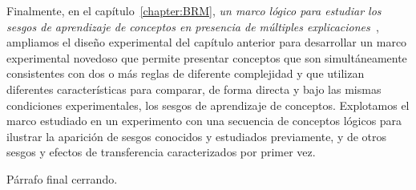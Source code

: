 Finalmente, en el capítulo~\ref{chapter:BRM}, \textit{un marco lógico para estudiar los sesgos de aprendizaje de conceptos en presencia de múltiples explicaciones~\cite{tano2021framework}}, ampliamos el diseño experimental del capítulo anterior para desarrollar un marco experimental novedoso que permite presentar conceptos que son simultáneamente consistentes con dos o más reglas de diferente complejidad y que utilizan diferentes características para comparar, de forma directa y bajo las mismas condiciones experimentales, los sesgos de aprendizaje de conceptos. Explotamos el marco estudiado en un experimento con una secuencia de conceptos lógicos para ilustrar la aparición de sesgos conocidos y estudiados previamente, y de otros sesgos y efectos de transferencia caracterizados por primer vez. 

Párrafo final cerrando.